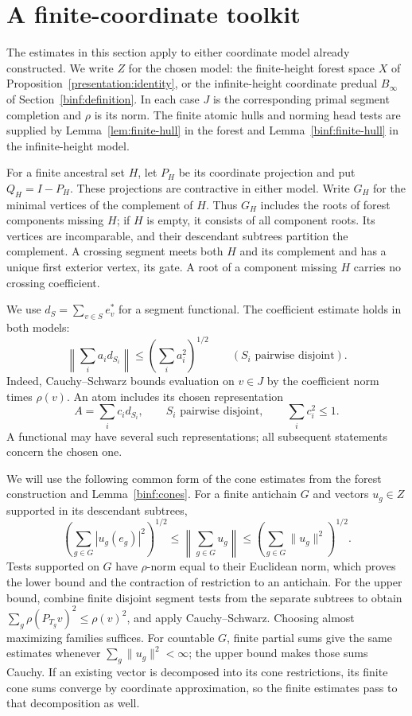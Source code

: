 \section{A finite-coordinate toolkit}\label{stab:toolkit}

The estimates in this section apply to either coordinate model already
constructed. We write $Z$ for the chosen model: the finite-height
forest space $X$ of Proposition~\ref{presentation:identity}, or the
infinite-height coordinate predual $B_\infty$ of
Section~\ref{binf:definition}. In each case $J$ is the corresponding
primal segment completion and $\rho$ is its norm. The finite atomic
hulls and norming head tests are supplied by
Lemma~\ref{lem:finite-hull} in the forest and
Lemma~\ref{binf:finite-hull} in the infinite-height model.

For a finite ancestral set $H$, let $P_H$ be its coordinate projection
and put $Q_H=I-P_H$. These projections are contractive in either
model. Write $G_H$ for the minimal vertices of the complement of $H$.
Thus $G_H$ includes the roots of forest components missing $H$; if
$H$ is empty, it consists of all component roots. Its vertices are
incomparable, and their descendant subtrees partition the complement.
A crossing segment meets both $H$ and its complement and has a unique
first exterior vertex, its gate. A root of a component missing $H$
carries no crossing coefficient.

We use $d_S=\sum_{v\in S}e_v^*$ for a segment functional. The
coefficient estimate holds in both models:
\begin{equation}\label{stab:sign:coefficients}
 \left\|\sum_i a_i d_{S_i}\right\|
 \le\left(\sum_i a_i^2\right)^{1/2}
 \qquad(S_i\text{ pairwise disjoint}).
\end{equation}
Indeed, Cauchy--Schwarz bounds evaluation on $v\in J$ by the
coefficient norm times $\rho(v)$. An atom includes its
chosen representation
\[
 A=\sum_i c_i d_{S_i},\qquad S_i\text{ pairwise disjoint},
 \qquad \sum_i c_i^2\le1.
\]
A functional may have several such representations; all subsequent
statements concern the chosen one.

We will use the following common form of the cone estimates from the
forest construction and Lemma~\ref{binf:cones}. For a finite antichain
$G$ and vectors $u_g\in Z$ supported in its descendant subtrees,
\begin{equation}\label{stab:cone-bounds}
 \left(\sum_{g\in G}|u_g(e_g)|^2\right)^{1/2}
 \le\left\|\sum_{g\in G}u_g\right\|
 \le\left(\sum_{g\in G}\|u_g\|^2\right)^{1/2}.
\end{equation}
Tests supported on $G$ have $\rho$-norm equal to their Euclidean
norm, which proves the lower bound and the contraction of restriction
to an antichain. For the upper bound, combine finite disjoint segment
tests from the separate subtrees to obtain
$\sum_g\rho(P_{T_g}v)^2\le\rho(v)^2$, and apply
Cauchy--Schwarz. Choosing almost maximizing families suffices.
For countable $G$, finite partial sums give the same estimates whenever
$\sum_g\|u_g\|^2<\infty$; the upper bound makes those sums Cauchy.
If an existing vector is decomposed into its cone restrictions, its
finite cone sums converge by coordinate approximation, so the finite
estimates pass to that decomposition as well.

